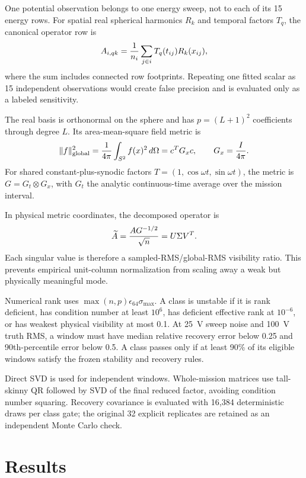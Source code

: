 \documentclass[11pt]{article}
\begin{document}
One potential observation belongs to one energy sweep, not to each of its 15
energy rows.  For spatial real spherical harmonics $R_k$ and temporal factors
$T_q$, the canonical operator row is
\begin{equation}
 A_{i,qk}={1\over n_i}\sum_{j\in i}T_q(t_{ij})R_k(x_{ij}),
 \label{eq:operator}
\end{equation}
where the sum includes connected row footprints.  Repeating one fitted scalar
as 15 independent observations would create false precision and is evaluated
only as a labeled sensitivity.

The real basis is orthonormal on the sphere and has
$p=(L+1)^2$ coefficients through degree $L$.  Its area-mean-square field metric
is
\begin{equation}
 \|f\|_{\rm global}^2={1\over4\pi}\int_{S^2}f(x)^2\,d\Omega
 =c^TG_xc,\qquad G_x={I\over4\pi}.
\end{equation}
For shared constant-plus-synodic factors
$T=(1,\cos\omega t,\sin\omega t)$, the metric is
$G=G_t\otimes G_x$, with $G_t$ the analytic continuous-time average over the
mission interval.

In physical metric coordinates, the decomposed operator is
\begin{equation}
 \widetilde A={A G^{-1/2}\over\sqrt n}=U\Sigma V^T.
 \label{eq:svd}
\end{equation}
Each singular value is therefore a sampled-RMS/global-RMS visibility ratio.
This prevents empirical unit-column normalization from scaling away a weak but
physically meaningful mode.

Numerical rank uses
$\max(n,p)\epsilon_{64}\sigma_{\max}$.  A class is unstable if it is rank
deficient, has condition number at least $10^6$, has deficient effective rank
at $10^{-6}$, or has weakest physical visibility at most 0.1.  At 25~V sweep
noise and 100~V truth RMS, a window must have median relative recovery error
below 0.25 and 90th-percentile error below 0.5.  A class passes only if at least
90\% of its eligible windows satisfy the frozen stability and recovery rules.

Direct SVD is used for independent windows.  Whole-mission matrices use
tall-skinny QR followed by SVD of the final reduced factor, avoiding condition
number squaring.  Recovery covariance is evaluated with 16,384 deterministic
draws per class gate; the original 32 explicit replicates are retained as an
independent Monte Carlo check.

\section{Results}
\end{document}

